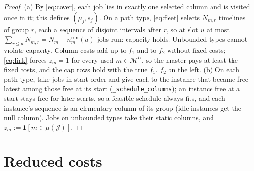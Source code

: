 \documentclass[11pt,a4paper]{article}
\theoremstyle{definition}
\theoremstyle{remark}
\newcommand{\J}{\mathcal{J}}
\newcommand{\M}{\mathcal{M}}
\newcommand{\MU}{\M^{U}}
\newcommand{\code}[1]{\texttt{#1}}
\newcommand{\ind}[1]{\mathbf{1}[#1]}
\newcommand{\nrun}{n^{\mathrm{run}}}
\begin{document}
\begin{proof}
(a) By \eqref{eq:cover}, each job lies in exactly one selected column and is
visited once in it; this defines $(\mu_j,s_j)$. On a path type, \eqref{eq:fleet}
selects $N_{m,r}$ timelines of group $r$, each a sequence of disjoint intervals
after $r$, so at slot $u$ at most $\sum_{r\le u}N_{m,r}=N_m-\nrun_m(u)$ jobs
run: capacity holds. Unbounded types cannot violate capacity. Column costs add
up to $f_1$ and to $f_2$ without fixed costs; \eqref{eq:link} forces $z_m=1$
for every used $m\in\MU$, so the master pays at least the fixed costs, and the
cap rows hold with the true $f_1$, $f_2$ on the left. (b) On each path type,
take jobs in start order and give each to the instance that became free
latest among those free at its start (\code{\_schedule\_columns}); an instance
free at a start stays free for later starts, so a feasible schedule always
fits, and each instance's sequence is an elementary column of its group (idle
instances get the null column). Jobs on unbounded types take their static
columns, and $z_m:=\ind{m\in\mu(\J)}$.
\end{proof}

\section{Reduced costs}\label{sec:rc}
\end{document}
